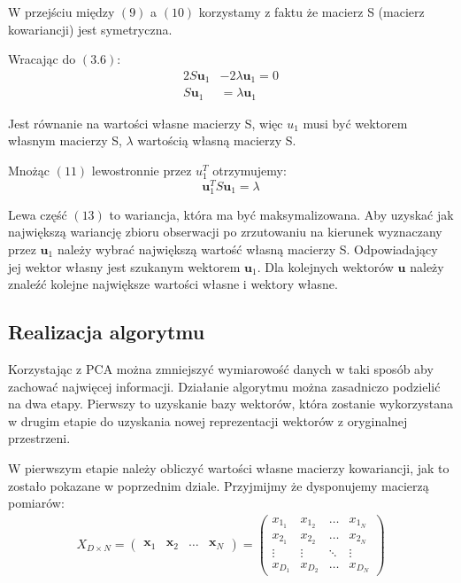 \documentclass[oneside, eng]{mgr}
\newcommand{\bb}{\textbf}
\begin{document}
W przejściu między $(9)$ a $(10)$ korzystamy z faktu że macierz S (macierz kowariancji) jest symetryczna.

Wracając do $(3.6)$:
\begin{align}
	2 S \bb{u}_1 &- 2 \lambda \bb{u}_1 = 0	\nonumber \\
	S \bb{u}_1 &= \lambda \bb{u}_1 
\end{align}

Jest równanie na wartości własne macierzy S, więc $u_1$ musi być wektorem własnym macierzy S, $\lambda$ wartością własną macierzy S.

Mnożąc $(11)$ lewostronnie przez $u_1^T$ otrzymujemy:
\begin{equation}
	\bb{u}_1^T S \bb{u}_1 = \lambda
\end{equation}

Lewa część $(13)$ to wariancja, która ma być maksymalizowana. Aby uzyskać jak największą wariancję zbioru obserwacji po zrzutowaniu na kierunek wyznaczany przez $\bb{u}_1$ należy wybrać największą wartość własną macierzy S. Odpowiadający jej wektor własny jest szukanym wektorem $\bb{u}_1$. Dla kolejnych wektorów $\bb{u}$ należy znaleźć kolejne największe wartości własne i wektory własne.

\subsection{Realizacja algorytmu}  \label{Realizacja algorytmu}
Korzystając z PCA można zmniejszyć wymiarowość danych w taki sposób aby zachować najwięcej informacji. Działanie algorytmu można zasadniczo podzielić na dwa etapy. Pierwszy to uzyskanie bazy wektorów, która zostanie wykorzystana w drugim etapie do uzyskania nowej reprezentacji wektorów z oryginalnej przestrzeni.

W pierwszym etapie należy obliczyć wartości własne macierzy kowariancji, jak to zostało pokazane w poprzednim dziale. Przyjmijmy że dysponujemy macierzą pomiarów:
\begin{align}
	X_{D \times N} = 
	\left( \begin{array}{llll}
		\bb{x}_1 & \bb{x}_2 & \ldots & \bb{x}_N
	\end{array} \right)	
	=
	\left( \begin{array}{llll}
		x_{1_1} & x_{1_2} & \ldots & x_{1_N} \\
		x_{2_1} & x_{2_2} & \ldots & x_{2_N} \\
		\vdots  & \vdots  & \ddots & \vdots  \\
		x_{D_1} & x_{D_2} & \ldots & x_{D_N}
	\end{array} \right)
\end{align}
\end{document}
